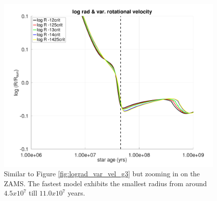 \documentclass[fleqn,usenatbib]{mnras}
\begin{document}
\begin{figure}
	\includegraphics[clip,width=\columnwidth]{figures/paper2/lograd_var_vel_g_z13.pdf}
    \caption{Similar to Figure \ref{fig:lograd_var_vel_g3} but zooming in on the ZAMS. The fastest model exhibits the smallest radius from around $4.5x10^{7}$ till $11.0x10^{7}$ years.}
    \label{fig:lograd_var_vel_g_z13}
\end{figure}
\end{document}

